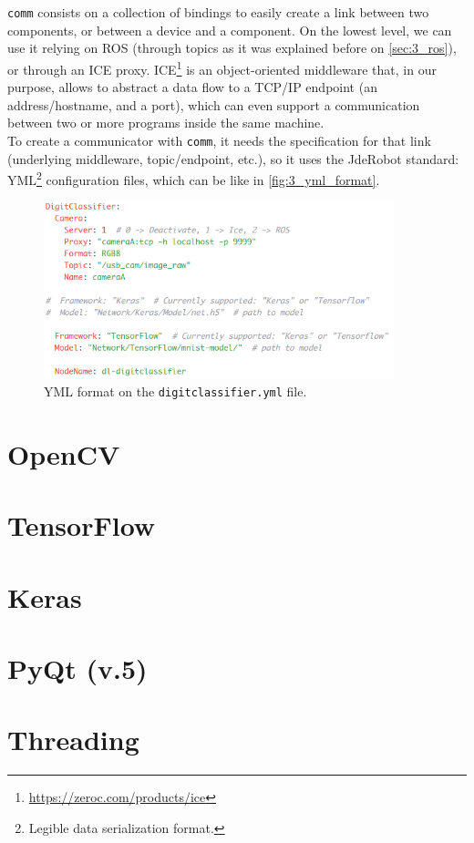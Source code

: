 		\texttt{comm} consists on a collection of bindings to easily create a link between two components, or between a device and a component. On the lowest level, we can use it relying on ROS (through topics as it was explained before on \autoref{sec:3_ros}), or through an ICE proxy. ICE\footnote{\url{https://zeroc.com/products/ice}} is an object-oriented middleware that, in our purpose, allows to abstract a data flow to a TCP/IP endpoint (an address/hostname, and a port), which can even support a communication between two or more programs inside the same machine.\\
		
		To create a communicator with \texttt{comm}, it needs the specification for that link (underlying middleware, topic/endpoint, etc.), so it uses the JdeRobot standard: YML\footnote{Legible data serialization format.} configuration files, which can be like in \autoref{fig:3_yml_format}.
		\begin{figure}[h]
			\centering
			\includegraphics[width=4in]{images/yml_format}
			\caption{YML format on the \texttt{digitclassifier.yml} file.}
			\label{fig:3_yml_format}
		\end{figure}
		
\section{OpenCV}
\section{TensorFlow}
\label{sec:3_tensorflow}
\section{Keras}
\section{PyQt (v.5)}
\section{Threading}
